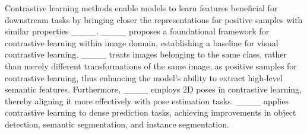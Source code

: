 Contrastive learning methods enable models to learn features beneficial for downstream tasks by bringing closer the representations for positive samples with similar properties ____. ____ proposes a foundational framework for contrastive learning within image domain, establishing a baseline for visual contrastive learning. ____ treats images belonging to the same class, rather than merely different transformations of the same image, as positive samples for contrastive learning, thus enhancing the model's ability to extract high-level semantic features. Furthermore, ____ employs 2D poses in contrastive learning, thereby aligning it more effectively with pose estimation tasks. ____ applies contrastive learning to dense prediction tasks, achieving improvements in object detection, semantic segmentation, and instance segmentation.



